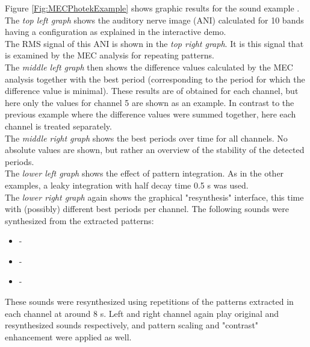 Figure \ref{Fig:MECPhotekExample} shows graphic results for the
sound example
.\\

The \emph{top left graph} shows the auditory nerve image (ANI)
calculated for 10 bands having a configuration as explained in the interactive demo.\\

The RMS signal of this ANI is shown in the \emph{top right graph}.
It is this signal that is examined by the MEC analysis for repeating patterns.\\

The \emph{middle left graph} then shows the difference values
calculated by the MEC analysis together with the best period
(corresponding to the period for which the difference value is
minimal). These results are of obtained for each channel, but here
only the values for channel 5 are shown as an example. In contrast
to the previous example where the difference values were summed
together, here each channel is treated separately.\\

The \emph{middle right graph} shows the best periods over time for
all channels. No absolute values are shown, but rather an overview
of the stability of the detected periods.\\

The \emph{lower left graph} shows the effect of  pattern
integration. As in the other examples, a leaky integration with
half decay time 0.5 s was used.\\

The \emph{lower right graph} again shows the graphical
"resynthesis" interface, this time with (possibly) different best
periods per channel. The following sounds were synthesized from
the extracted patterns:
\begin{itemize}
\item[] - 
\item[] - 
\item[] - 
\end{itemize}
These sounds were resynthesized using repetitions of the patterns
extracted in each channel at around 8 s. Left and right channel
again play original and resynthesized sounds respectively, and
pattern scaling and "contrast" enhancement were applied as well.


